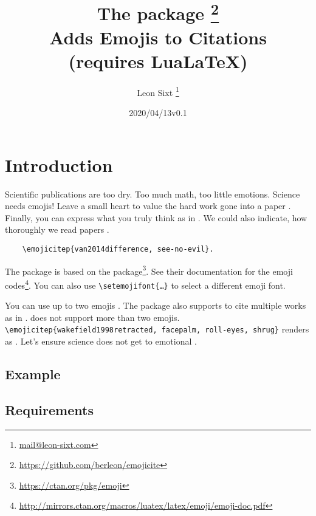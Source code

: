 \documentclass{l3doc}
\title{The \pkg{emojicite} package \thanks{\url{https://github.com/berleon/emojicite}} \\
  Adds Emojis to Citations \\
  \normalsize (requires Lua\LaTeX)}
\author{Leon Sixt \thanks{\url{mail@leon-sixt.com}}}
\date{\emoji{date} 2020/04/13\quad v0.1}
\begin{document}
\maketitle

\tableofcontents

\setlength{\parskip}{0.5em}

\section{Introduction}

Scientific publications are too dry. Too much math, too little emotions. Science
needs emojis!
Leave a small heart to value the hard work gone into a paper .
Finally, you can express what you truly think as in .
We could also indicate, how thoroughly we read papers .

\begin{verbatim}
    \emojicitep{van2014difference, see-no-evil}.
\end{verbatim}


The package is based on the  package\footnote{\url{https://ctan.org/pkg/emoji}}.
See their documentation for the emoji codes\footnote{\url{http://mirrors.ctan.org/macros/luatex/latex/emoji/emoji-doc.pdf}}. You can also use \texttt{\textbackslash setemojifont\{\dots\}} to select a different emoji font.


You can use up to two emojis . The package also supports
to cite multiple works as in .
 does not support more than two emojis.
\texttt{\textbackslash emojicitep\{wakefield1998retracted, facepalm, roll-eyes, shrug\}}
renders as .
Let's ensure science does not get to emotional .

\newpage
\subsection{Example}


\subsection{Requirements}
\end{document}

